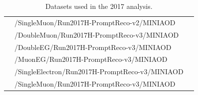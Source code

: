 \begin{table}[h]
\begin{tabular}{|l|l|l|}
 & /SingleMuon/Run2017H-PromptReco-v2/MINIAOD &  \\ 
 & /DoubleMuon/Run2017H-PromptReco-v3/MINIAOD &  \\ 
 & /DoubleEG/Run2017H-PromptReco-v3/MINIAOD &  \\ 
 & /MuonEG/Run2017H-PromptReco-v3/MINIAOD &  \\ 
 & /SingleElectron/Run2017H-PromptReco-v3/MINIAOD &  \\ 
 & /SingleMuon/Run2017H-PromptReco-v3/MINIAOD &  \\ 
\hline %
\hline %
     \end{tabular}
\small
    \caption{ Datasets used in the 2017 analysis. }
    \label{tab:datasets_dataB}
\end{table}


